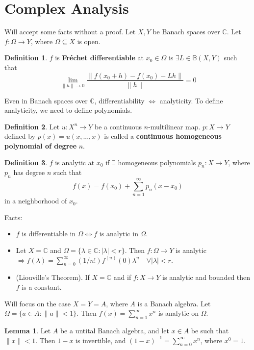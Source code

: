 \documentclass{article}
\theoremstyle{definition}
\newtheorem{lem}{Lemma}
\newtheorem{dfn}{Definition}
\newcommand{\BB}{\mathbb B}
\newcommand{\CC}{\mathbb C}
\newcommand{\Ra}{\Rightarrow}
\newcommand{\Lra}{\Leftrightarrow}
\begin{document}
\section{Complex Analysis}

Will accept some facts without a proof.
Let $X, Y$ be Banach spaces over $\CC$.
Let $f: \Omega \to Y$, where $\Omega \subseteq X$ is open.

\begin{dfn}
	$f$ is \textbf{Fr\'echet differentiable} at $x_0 \in \Omega$ is $\exists L \in \BB(X, Y)$ such that
	\[
		\lim_{\|h\| \to 0} \frac{\|f(x_0 + h) - f(x_0) - L h\|}{\|h\|} = 0
	\]
\end{dfn}

Even in Banach spaces over $\CC$, differentiability $\Lra$ analyticity.
To define analyticity, we need to define polynomials.

\begin{dfn}
	Let $u: X^n \to Y$ be a continuous $n$-multilinear map.
	$p: X \to Y$ defined by $p(x) = u(x, ..., x)$ is called a \textbf{continuous homogeneous polynomial of degree} $n$.
\end{dfn}

\begin{dfn}
	$f$ is analytic at $x_0$ if $\exists$ homogeneous polynomials $p_n: X \to Y$, where $p_n$ has degree $n$ such that
	\[
		f(x) = f(x_0) + \sum_{n = 1}^\infty p_n(x - x_0)
	\]
	in a neighborhood of $x_0$.
\end{dfn}

Facts:
\begin{itemize}
	\item $f$ is differentiable in $\Omega \Lra f$ is analytic in $\Omega$.

	\item Let $X = \CC$ and $\Omega = \{\lambda \in \CC: |\lambda| < r\}$.
		Then $f: \Omega \to Y$ is analytic $\Ra f(\lambda) = \sum_{n = 0}^\infty (1/n!) f^{(n)} (0) \lambda^n \quad \forall |\lambda| < r$.

	\item (Liouville's Theorem).
		If $X = \CC$ and if $f: X \to Y$ is analytic and bounded then $f$ is a constant.
\end{itemize}

Will focus on the case $X = Y = A$, where $A$ is a Banach algebra.
Let $\Omega = \{a \in A: \|a\| < 1\}$.
Then $f(x) = \sum_{n = 1}^\infty x^n$ is analytic on $\Omega$.

\begin{lem}
	Let $A$ be a untital Banach algebra, and let $x \in A$ be such that $\|x\| < 1$.
	Then $1 - x$ is invertible, and $(1 - x)^{-1} = \sum_{n = 0}^\infty x^n$, where $x^0 = 1$.
\end{lem}
\end{document}
